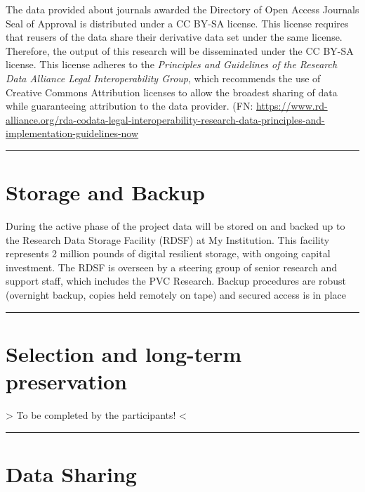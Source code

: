 \documentclass[]{article}
\begin{document}
The data provided about journals awarded the Directory of Open Access
Journals Seal of Approval is distributed under a CC BY-SA license. This
license requires that reusers of the data share their derivative data
set under the same license. Therefore, the output of this research will
be disseminated under the CC BY-SA license. This license adheres to the
\emph{Principles and Guidelines of the Research Data Alliance Legal
Interoperability Group}, which recommends the use of Creative Commons
Attribution licenses to allow the broadest sharing of data while
guaranteeing attribution to the data provider. (FN:
\url{https://www.rd-alliance.org/rda-codata-legal-interoperability-research-data-principles-and-implementation-guidelines-now}

\begin{center}\rule{0.5\linewidth}{\linethickness}\end{center}

\section{Storage and Backup}\label{storage-and-backup}

During the active phase of the project data will be stored on and backed
up to the Research Data Storage Facility (RDSF) at My Institution. This
facility represents 2 million pounds of digital resilient storage, with
ongoing capital investment. The RDSF is overseen by a steering group of
senior research and support staff, which includes the PVC Research.
Backup procedures are robust (overnight backup, copies held remotely on
tape) and secured access is in place

\begin{center}\rule{0.5\linewidth}{\linethickness}\end{center}

\section{Selection and long-term
preservation}\label{selection-and-long-term-preservation}

\textbar{}\textbar{}\textgreater{} To be completed by the participants!
\textless{}\textbar{}\textbar{}

\begin{center}\rule{0.5\linewidth}{\linethickness}\end{center}

\section{Data Sharing}\label{data-sharing}
\end{document}

